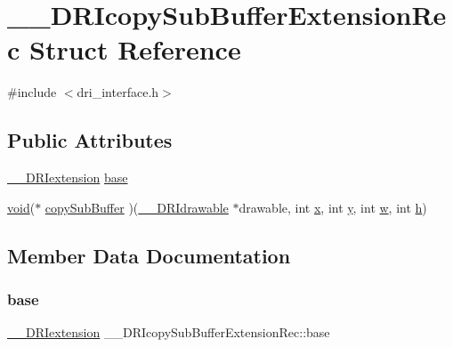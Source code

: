 \hypertarget{struct_____d_r_icopy_sub_buffer_extension_rec}{}\section{\+\_\+\+\_\+\+D\+R\+Icopy\+Sub\+Buffer\+Extension\+Rec Struct Reference}
\label{struct_____d_r_icopy_sub_buffer_extension_rec}


{\ttfamily \#include $<$dri\+\_\+interface.\+h$>$}

\subsection*{Public Attributes}
\begin{DoxyCompactItemize}
\item 
\hyperlink{dri__interface_8h_a4e0a61c8ece00d2b2c6792a9a1b55385}{\+\_\+\+\_\+\+D\+R\+Iextension} \hyperlink{struct_____d_r_icopy_sub_buffer_extension_rec_af6b56a9cba33f5cc35a9a6c7a559213b}{base}
\item 
\hyperlink{_s_d_l__opengles2__gl2ext_8h_ae5d8fa23ad07c48bb609509eae494c95}{void}($\ast$ \hyperlink{struct_____d_r_icopy_sub_buffer_extension_rec_a54603b471dc4e14aa04ecb05f3459b47}{copy\+Sub\+Buffer} )(\hyperlink{dri__interface_8h_a5bfb832a0a08208d95b3bbef439d2262}{\+\_\+\+\_\+\+D\+R\+Idrawable} $\ast$drawable, int \hyperlink{gl_8h_ad0e63d0edcdbd3d79554076bf309fd47}{x}, int \hyperlink{gl_8h_a1675d9d7bb68e1657ff028643b4037e3}{y}, int \hyperlink{glcorearb_8h_a6ee8f168a7ab6785a9bb57c6715dad99}{w}, int \hyperlink{glcorearb_8h_afa0fb1b5e976920c0abeff2dca3ed774}{h})
\end{DoxyCompactItemize}


\subsection{Member Data Documentation}
\mbox{\label{struct_____d_r_icopy_sub_buffer_extension_rec_af6b56a9cba33f5cc35a9a6c7a559213b}} 
\subsubsection{\texorpdfstring{base}{base}}
{\footnotesize\ttfamily \hyperlink{dri__interface_8h_a4e0a61c8ece00d2b2c6792a9a1b55385}{\+\_\+\+\_\+\+D\+R\+Iextension} \+\_\+\+\_\+\+D\+R\+Icopy\+Sub\+Buffer\+Extension\+Rec\+::base}

